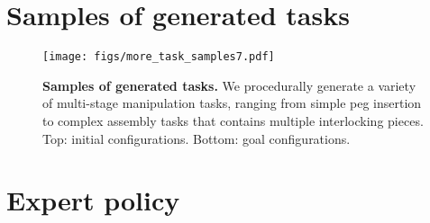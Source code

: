 \section{Samples of generated tasks}\label{sec:app_more_task_samples}
\begin{figure*}[h!]
    \centering
    \texttt{[image: figs/more\_task\_samples7.pdf]}
    \caption{\textbf{Samples of generated tasks.} We procedurally generate a variety of multi-stage manipulation tasks, ranging from simple peg insertion to complex assembly tasks that contains multiple interlocking pieces. Top: initial configurations. Bottom: goal configurations.}
    \label{fig:more_task_samples}
\end{figure*}


\newpage
\section{Expert policy}\label{sec:app_expert}

